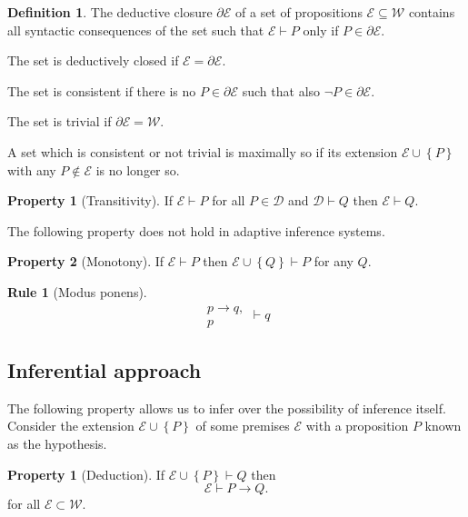 \documentclass{amsbook}
\newcommand{\setsm}[1]{\left\{#1\right\}}
\newcommand{\wffs}{\mathcal W}
\newcommand{\infers}{\mathrel\vdash}
\newcommand{\then}{\mathrel\rightarrow}
\theoremstyle{definition}
\newtheorem{prop}{Property}[section]
\newtheorem{subprop}{Property}[subsection]
\newtheorem{frule}{Rule}[chapter]
\newtheorem{dfn}{Definition}[section]
\begin{document}
\begin{dfn}
    The deductive closure $\partial \mathcal E$ of a set of propositions $\mathcal E \subseteq \wffs$ contains all syntactic consequences of the set such that $\mathcal E \infers P$ only if $P \in \partial\mathcal E$.

    The set is deductively closed if $\mathcal E = \partial\mathcal E$.

    The set is consistent if there is no $P \in \partial\mathcal E$ such that also $\neg P \in \partial\mathcal E$.

    The set is trivial if $\partial\mathcal E = \wffs$.

    A set which is consistent or not trivial is maximally so if its extension $\mathcal E \cup \setsm P$ with any $P \notin \mathcal E$ is no longer so.
\end{dfn}

\begin{prop}[Transitivity]
    If $\mathcal E \infers P$ for all $P \in \mathcal D$ and $\mathcal D \infers Q$ then $\mathcal E \infers Q$.
\end{prop}

The following property does not hold in adaptive inference systems.

\begin{prop}[Monotony]
    If $\mathcal E \infers P$ then $\mathcal E \cup \setsm Q \infers P$ for any $Q$.
\end{prop}

\begin{frule}[Modus ponens]
    $$\begin{aligned}p \rightarrow q, \\ p\end{aligned} \infers q$$
\end{frule}

\subsection{Inferential approach}

The following property allows us to infer over the possibility of inference itself. Consider the extension $\mathcal E \cup\setsm P$ of some premises $\mathcal E$ with a proposition $P$ known as the hypothesis.

\begin{subprop}[Deduction]
    If $\mathcal E \cup\setsm P \infers Q$ then
    $$\mathcal E \infers P \then Q.$$
    for all $\mathcal E \subset \wffs$.
\end{subprop}
\end{document}
